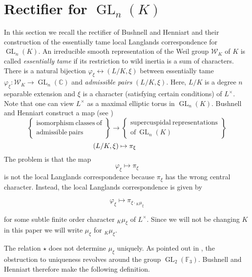\documentclass[11pt]{amsart}
\theoremstyle{plain}
\theoremstyle{definition}
\DeclareMathOperator{\GL}{GL}
\newcommand{\Lx}{L^\times}
\newcommand{\Weil}{\mathcal{W}}
\begin{document}
\section{Rectifier for $\GL_{n}(K)$} \label{section:BH_recall}

In this section we recall the rectifier of Bushnell and Henniart and their construction of the
essentially tame local Langlands correspondence for $\GL_{n}(K)$.
An irreducible smooth representation of the Weil group $\Weil_K$ of $K$ is
called \emph{essentially tame} if its restriction to wild inertia is a
sum of characters.  There is a natural bijection
$\varphi_{\xi} \leftrightarrow (L/K, \xi)$ between essentially tame
$\varphi_{\xi} : \Weil_K \rightarrow \GL_{n}(\mathbb{C})$ and
\emph{admissible pairs} $(L/K, \xi)$.
Here, $L/K$ is a degree $n$ separable extension
and $\xi$ is a character (satisfying certain conditions) of $\Lx$.
Note that one can view
$L^{\times}$ as a maximal elliptic torus in $\GL_{n}(K)$.  Bushnell and Henniart
construct a map (see \cite{bushnell-henniart:10a})
\begin{equation*}
\left\{
\begin{array}{cc}
\mathrm{isomorphism \ classes \ of} \\
\mathrm{admissible \ pairs}
\end{array}
\right\} \rightarrow \left\{
\begin{array}{cc}
\mathrm{supercuspidal \ representations} \\
\mathrm{of} \ \GL_{n}(K)
\end{array} \right\}
\end{equation*}
$$\hspace{-.5in} (L/K, \xi) \mapsto \pi_{\xi}$$
The problem is that the map $$\varphi_{\xi} \mapsto \pi_{\xi}$$
is not the local Langlands
correspondence because $\pi_{\xi}$ has the wrong central character.
Instead, the local Langlands correspondence is given by

\begin{equation}\label{llcgln}
\varphi_{\xi} \mapsto \pi_{\xi \cdot {}_K \mu_{\xi}} \tag{$\star$}
\end{equation}

for some subtle finite order
character ${}_K \mu_{\xi}$ of $\Lx$.  Since we will not be changing $K$
in this paper we will write $\mu_\xi$ for ${}_K \mu_{\xi}$.

The relation $\star$ does not determine $\mu_{\xi}$ uniquely.  As pointed out
in \cite{bushnell-henniart:10a}, the obstruction to uniqueness revolves around the
group $\GL_2(\mathbb{F}_3)$.  Bushnell and Henniart therefore make the following definition.
\end{document}

